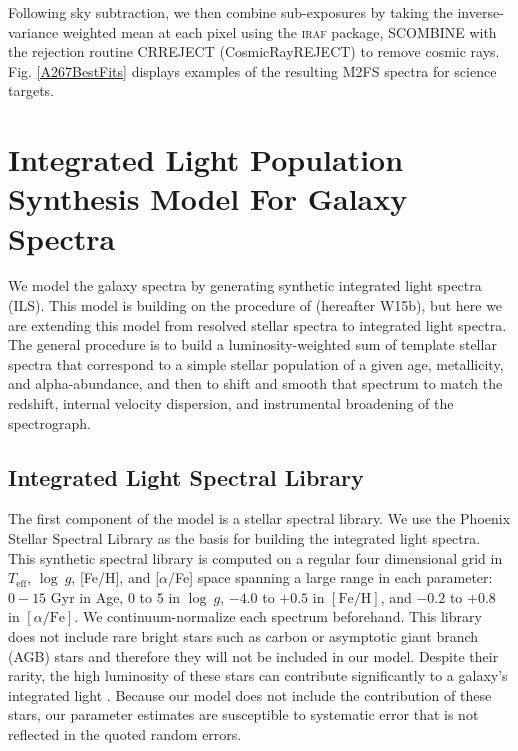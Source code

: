 \documentclass[twocolumn]{aastex6}
\def\feh{\mathrm{[Fe/H]}}
\def\afe{[\alpha/\mathrm{Fe}]}
\begin{document}
Following sky subtraction, we then combine sub-exposures by taking the inverse-variance weighted mean at each pixel using the \textsc{iraf} package, SCOMBINE with the rejection routine CRREJECT (CosmicRayREJECT) to remove cosmic rays.
Fig. \ref{A267BestFits} displays examples of the resulting M2FS spectra for science targets.

\section{Integrated Light Population Synthesis Model For Galaxy Spectra}
\label{ILSSPM}
We model the galaxy spectra by generating synthetic integrated light spectra (ILS).
This model is building on the procedure of \citet{Walker2015a} (hereafter W15b), but here we are extending this model from resolved stellar spectra to integrated light spectra.
The general procedure is to build a luminosity-weighted sum of template stellar spectra that correspond to a simple stellar population of a given age, metallicity, and alpha-abundance, and then to shift and smooth that spectrum to match the redshift, internal velocity dispersion, and instrumental broadening of the spectrograph.

\subsection{Integrated Light Spectral Library}
\label{ILS Library}

The first component of the model is a stellar spectral library.
We use the Phoenix Stellar Spectral Library \citep{Husser2013} as the basis for building the integrated light spectra.
This synthetic spectral library is computed on a regular four dimensional grid in $T_\mathrm{eff}$, $\log\ g$, [Fe/H], and [$\alpha$/Fe] space spanning a large range in each parameter: $0-15$ Gyr in Age, $0$ to $5$ in $\log\ g$, $-4.0$ to $+0.5$ in $\feh$, and $-0.2$ to $+0.8$ in $\afe$.
We continuum-normalize each spectrum beforehand.
This library does not include rare bright stars such as carbon or asymptotic giant branch (AGB) stars and therefore they will not be included in our model.
Despite their rarity, the high luminosity of these stars can contribute significantly to a galaxy's integrated light \citep{Conroy2010}.
Because our model does not include the contribution of these stars, our parameter estimates are susceptible to systematic error that is not reflected in the quoted random errors.
\end{document}
